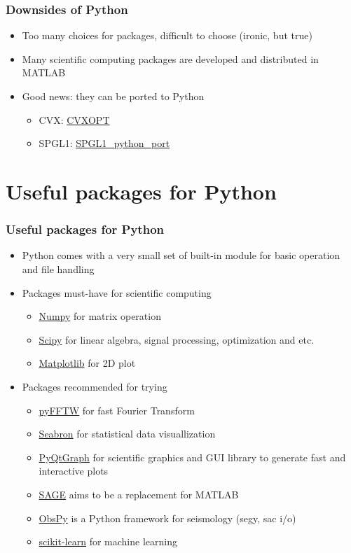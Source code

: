 \documentclass[compress]{beamer}
\begin{document}
\begin{frame}
	\frametitle{Downsides of Python}
	\begin{itemize}
		\item Too many choices for packages, difficult to choose (ironic, but true)
		\item Many scientific computing packages are developed and distributed in MATLAB
		\item Good news: they can be ported to Python
		\begin{itemize}
			\item CVX: \href{http://cvxopt.org/}{CVXOPT}
			\item SPGL1: \href{https://github.com/drrelyea/SPGL1\_python\_port}{SPGL1\_python\_port}
		\end{itemize}
	\end{itemize}
\end{frame}



\section{Useful packages for Python}
\begin{frame}
	\frametitle{Useful packages for Python}
	\begin{itemize}
		\item Python comes with a very small set of built-in module for basic operation and file handling
		\item Packages must-have for scientific computing
		\begin{itemize}
			\item \href{http://www.numpy.org/}{Numpy} for matrix operation
			\item \href{https://www.scipy.org/}{Scipy} for linear algebra, signal processing, optimization and etc.
			\item \href{http://matplotlib.org/}{Matplotlib} for 2D plot
		\end{itemize}
		\item Packages recommended for trying
		\begin{itemize}
			\item \href{https://hgomersall.github.io/pyFFTW/}{pyFFTW} for fast Fourier Transform
			\item \href{https://stanford.edu/~mwaskom/software/seaborn/}{Seabron} for statistical data visuallization
			\item \href{http://www.pyqtgraph.org/}{PyQtGraph} for scientific graphics and GUI library to generate fast and interactive plots
			\item \href{http://www.sagemath.org/}{SAGE} aims to be a replacement for MATLAB
			\item \href{https://github.com/obspy/obspy/wiki}{ObsPy} is a Python framework for seismology (segy, sac i/o)
			\item \href{http://scikit-learn.org/stable/}{scikit-learn} for machine learning 
		\end{itemize}
	\end{itemize}
\end{frame}
\end{document}
